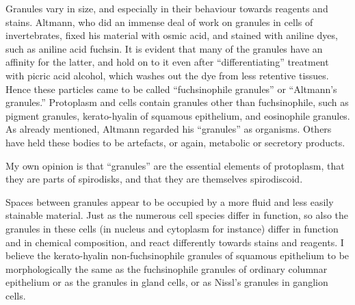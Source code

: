 \documentclass[a4paper, 12pt, oneside, landscape]{article}
\begin{document}
Granules vary in size, and especially in their behaviour towards reagents and stains. Altmann, who did an immense deal of work on granules in cells of invertebrates, fixed his material with osmic acid, and stained with aniline dyes, such as aniline acid fuchsin. It is evident that many of the granules have an affinity for the latter, and hold on to it even after ``differentiating'' treatment with picric acid alcohol, which washes out the dye from less retentive tissues. Hence these particles came to be called ``fuchsinophile granules'' or ``Altmann's granules.'' Protoplasm and cells contain granules other than fuchsinophile, such as pigment granules, kerato-hyalin of squamous epithelium, and eosinophile granules. As already mentioned, Altmann regarded his ``granules'' as organisms. Others have held these bodies to be artefacts, or again, metabolic or secretory products.

My own opinion is that ``granules'' are the essential elements of protoplasm, that they are parts of spirodisks, and that they are themselves spirodiscoid.

Spaces between granules appear to be occupied by a more fluid and less easily stainable material. Just as the numerous cell species differ in function, so also the granules in these cells (in nucleus and cytoplasm for instance) differ in function and in chemical composition, and react differently towards stains and reagents. I believe the kerato-hyalin non-fuchsinophile granules of squamous epithelium to be morphologically the same as the fuchsinophile granules of ordinary columnar epithelium or as the granules in gland cells, or as Nissl's granules in ganglion cells.
\end{document}
